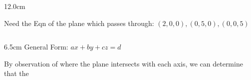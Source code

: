 \begin{frame}
\scriptsize
\begin{columns}\begin{column}{12.0cm}

	
	\vspace{0.2cm}

Need the Eqn of the plane which passes through: $(2,0,0), (0,5,0), (0,0,5)$	

\vspace{0.2cm}

\begin{columns}
\begin{column}{6.5cm}
General Form: $ax+by+cz=d$

\vspace{0.2cm}

By observation of where the plane intersects with each axis, we can determine that the 
	
%
%

%

	\vspace{0.3cm}
	
	
	\vspace{0.3cm}
	
	
	\vspace{0.3cm}
	

\end{column}
\end{columns}
\end{column}
\end{columns}
\end{frame}
